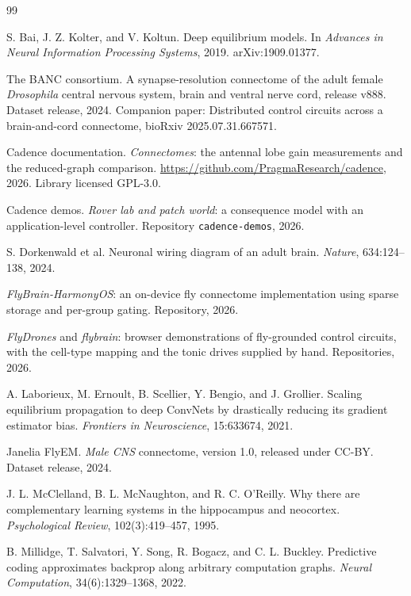 \documentclass[11pt]{article}
\theoremstyle{remark}
\begin{document}
\begin{thebibliography}{99}
\small

 S. Bai, J. Z. Kolter, and V. Koltun. Deep equilibrium models. In \emph{Advances in
Neural Information Processing Systems}, 2019. arXiv:1909.01377.

 The BANC consortium. A synapse-resolution connectome of the adult female
\emph{Drosophila} central nervous system, brain and ventral nerve cord, release v888. Dataset release,
2024. Companion paper: Distributed control circuits across a brain-and-cord connectome, bioRxiv
2025.07.31.667571.

 Cadence documentation. \emph{Connectomes}: the antennal lobe gain
measurements and the reduced-graph comparison. \url{https://github.com/PragmaResearch/cadence},
2026. Library licensed GPL-3.0.

 Cadence demos. \emph{Rover lab and patch world}: a consequence model with an
application-level controller. Repository \texttt{cadence-demos}, 2026.

 S. Dorkenwald et al. Neuronal wiring diagram of an adult brain.
\emph{Nature}, 634:124--138, 2024.

 \emph{FlyBrain-HarmonyOS}: an on-device fly connectome implementation using
sparse storage and per-group gating. Repository, 2026.

 \emph{FlyDrones} and \emph{flybrain}: browser demonstrations of fly-grounded
control circuits, with the cell-type mapping and the tonic drives supplied by hand. Repositories,
2026.

 A. Laborieux, M. Ernoult, B. Scellier, Y. Bengio, and J. Grollier.
Scaling equilibrium propagation to deep ConvNets by drastically reducing its gradient estimator
bias. \emph{Frontiers in Neuroscience}, 15:633674, 2021.

 Janelia FlyEM. \emph{Male CNS} connectome, version 1.0, released under
CC-BY. Dataset release, 2024.

 J. L. McClelland, B. L. McNaughton, and R. C. O'Reilly. Why there are
complementary learning systems in the hippocampus and neocortex. \emph{Psychological Review},
102(3):419--457, 1995.

 B. Millidge, T. Salvatori, Y. Song, R. Bogacz, and C. L. Buckley.
Predictive coding approximates backprop along arbitrary computation graphs. \emph{Neural
Computation}, 34(6):1329--1368, 2022.


\end{thebibliography}
\end{document}
